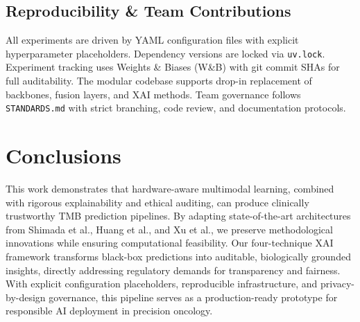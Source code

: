\documentclass[11pt,a4paper]{article}
\begin{document}
\subsection{Reproducibility \& Team Contributions}
All experiments are driven by YAML configuration files with explicit hyperparameter placeholders. Dependency versions are locked via \texttt{uv.lock}. Experiment tracking uses Weights \& Biases (W\&B) with git commit SHAs for full auditability. The modular codebase supports drop-in replacement of backbones, fusion layers, and XAI methods. Team governance follows \texttt{STANDARDS.md} with strict branching, code review, and documentation protocols.

\section{Conclusions}
\label{sec:conclusions}
This work demonstrates that hardware-aware multimodal learning, combined with rigorous explainability and ethical auditing, can produce clinically trustworthy TMB prediction pipelines. By adapting state-of-the-art architectures from Shimada et al., Huang et al., and Xu et al., we preserve methodological innovations while ensuring computational feasibility. Our four-technique XAI framework transforms black-box predictions into auditable, biologically grounded insights, directly addressing regulatory demands for transparency and fairness. With explicit configuration placeholders, reproducible infrastructure, and privacy-by-design governance, this pipeline serves as a production-ready prototype for responsible AI deployment in precision oncology.
\end{document}
